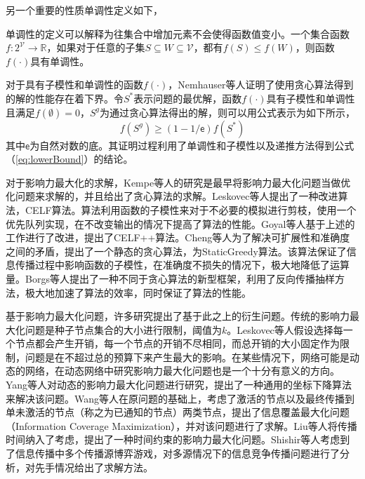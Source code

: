 另一个重要的性质单调性定义如下，
\begin{defn}[单调性]
\label{def:monotonicity}
单调性的定义可以解释为往集合中增加元素不会使得函数值变小。一个集合函数$f:2^{\mathcal{V}} \rightarrow \mathbb{R}$，如果对于任意的子集$S \subseteq W \subseteq \mathcal{V}$，都有$f\left(S\right) \leq f\left(W\right)$，则函数$f\left( \cdot \right)$具有单调性。
\end{defn}

对于具有子模性和单调性的函数$f\left( \cdot \right)$，Nemhauser等人证明了使用贪心算法得到的解的性能存在着下界。令$S^{\ast}$表示问题的最优解，函数$f\left( \cdot \right)$具有子模性和单调性且满足$f\left( \emptyset \right) = 0$，$S^g$为通过贪心算法得出的解，则可以用公式表示为如下所示，
\begin{equation}
\label{eq:lowerBound}
	f\left( S^g \right) \geq \left( 1 - 1/\mathsf{e} \right) f\left( S^{\ast} \right)
\end{equation}
其中$\mathsf{e}$为自然对数的底。其证明过程利用了单调性和子模性以及递推方法得到公式（\ref{eq:lowerBound}）的结论。

对于影响力最大化的求解，Kempe等人的研究是最早将影响力最大化问题当做优化问题来求解的，并且给出了贪心算法的求解。Leskovec等人提出了一种改进算法，CELF算法。算法利用函数的子模性来对于不必要的模拟进行剪枝，使用一个优先队列实现，在不改变输出的情况下提高了算法的性能。Goyal等人基于上述的工作进行了改进，提出了CELF++算法。Cheng等人为了解决可扩展性和准确度之间的矛盾，提出了一个静态的贪心算法，为StaticGreedy算法。该算法保证了信息传播过程中影响函数的子模性，在准确度不损失的情况下，极大地降低了运算量。Borgs等人提出了一种不同于贪心算法的新型框架，利用了反向传播抽样方法，极大地加速了算法的效率，同时保证了算法的性能。

基于影响力最大化问题，许多研究提出了基于此之上的衍生问题。传统的影响力最大化问题是种子节点集合的大小进行限制，阈值为$k$。Leskovec等人假设选择每一个节点都会产生开销，每一个节点的开销不尽相同，而总开销的大小固定作为限制，问题是在不超过总的预算下来产生最大的影响。在某些情况下，网络可能是动态的网络，在动态网络中研究影响力最大化问题也是一个十分有意义的方向。Yang等人对动态的影响力最大化问题进行研究，提出了一种通用的坐标下降算法来解决该问题。Wang等人在原问题的基础上，考虑了激活的节点以及最终传播到单未激活的节点（称之为已通知的节点）两类节点，提出了信息覆盖最大化问题（Information Coverage Maximization），并对该问题进行了求解。Liu等人将传播时间纳入了考虑，提出了一种时间约束的影响力最大化问题。Shishir等人考虑到了信息传播中多个传播源博弈游戏，对多源情况下的信息竞争传播问题进行了分析，对先手情况给出了求解方法。

